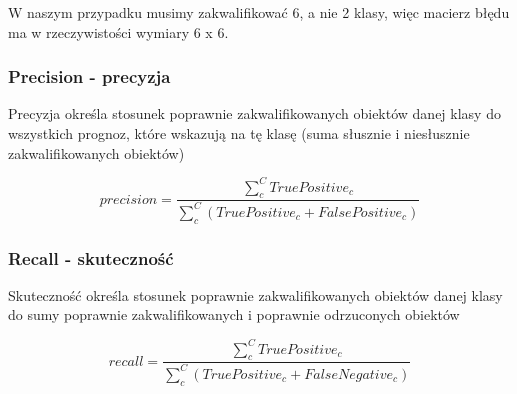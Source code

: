 \documentclass{classrep}
\begin{document}
W naszym przypadku musimy zakwalifikować 6, a nie 2 klasy, więc macierz błędu ma w rzeczywistości wymiary 6 x 6.

\subsubsection{Precision - precyzja}
Precyzja określa stosunek poprawnie zakwalifikowanych obiektów danej klasy do wszystkich prognoz, które wskazują na tę klasę (suma słusznie i niesłusznie zakwalifikowanych obiektów)

\begin{equation}
precision = \frac{\sum_{c}^C{True Positive_c}}{\sum_{c}^C({True Positive_c + False Positive_c})}
\end{equation}

\subsubsection{Recall - skuteczność}
Skuteczność określa stosunek poprawnie zakwalifikowanych obiektów danej klasy do sumy poprawnie zakwalifikowanych i poprawnie odrzuconych obiektów 

\begin{equation}
recall = \frac{\sum_{c}^C{True Positive_c}}{\sum_{c}^C({True Positive_c + False Negative_c})}
\end{equation}
\end{document}
